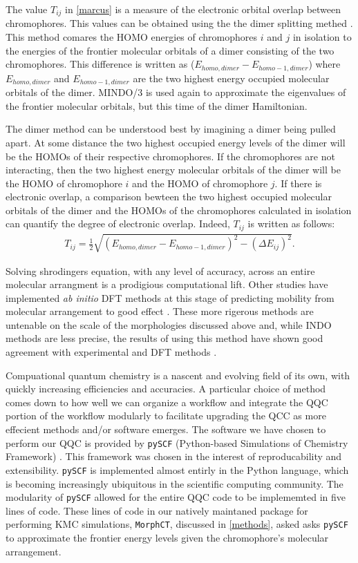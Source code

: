 The value $T_{ij}$ in \autoref{marcus} is a measure of the electronic orbital overlap between chromophores.
This values can be obtained using the
the dimer splitting methed \cite{Huang2005b}. This method comares the HOMO energies of chromophores $i$ and
$j$ in isolation to the energies of the frontier molecular orbitals of a dimer
consisting of the two chromophores. 
This difference is written as ($E_{homo,dimer} - E_{homo-1,dimer}$) where $E_{homo,dimer}$ 
and $E_{homo-1,dimer}$ are the two highest energy occupied molecular orbitals of the dimer. MINDO/3 is used
again to approximate the eigenvalues of the frontier molecular orbitals, but this time of the dimer
Hamiltonian. 

The dimer method can be understood best by imagining a dimer being pulled apart. At some distance
the two highest occupied energy levels of the dimer will 
be the HOMOs of their respective chromophores. 
If the chromophores are not interacting, 
then the two highest energy molecular orbitals of the dimer will be the HOMO of chromophore $i$ and the 
HOMO of chromophore $j$. If there is electronic overlap, a comparison bewteen the two highest occupied
molecular orbitals of the dimer and the HOMOs of the chromophores calculated in isolation can quantify the degree of
electronic overlap. Indeed, $T_{ij}$ is written as follows:
\begin{align}
    T_{ij} = \frac{1}{2}\sqrt{ (E_{homo,dimer} - E_{homo-1,dimer})^{2} - (\Delta E_{ij})^{2} }.
\end{align}
 
Solving shrodingers equation, with any level of accuracy,
across an entire molecular arrangment is a prodigious computational lift.
Other studies have implemented \textit{ab initio} DFT methods at this stage of predicting
mobility from molecular arrangement to good effect \cite{Deng2004}. These more rigerous methods are
untenable on the scale of the morphologies discussed above and, while INDO methods are less precise, the results
of using this method have shown good agreement with experimental and DFT methods \cite{Bredas2002}. 

Compuational quantum chemistry is a nascent and evolving field of its
own, with quickly increasing efficiencies and accuracies.
A particular 
choice of method comes down to how well we can organize a workflow and integrate the QQC portion of the
workflow modularly to facilitate upgrading the QCC as more effecient methods and/or software emerges.
The software we have chosen to perform our QQC is
provided by \texttt{pySCF} (Python-based Simulations of Chemistry Framework) \cite{Sun2018a}. This framework
was chosen in the interest of reproducability and extensibility.
\texttt{pySCF} is implemented almost entirly in the Python 
language, which is becoming increasingly ubiquitous in the scientific computing community. The modularity of
\texttt{pySCF} allowed for the entire QQC code to be implememted in five lines of code. These lines of code in 
our natively maintaned package
for performing KMC simulations, \texttt{MorphCT}, discussed in
\autoref{methods}, asked asks \texttt{pySCF} to approximate the frontier
energy levels given the chromophore's molecular arrangement.  


